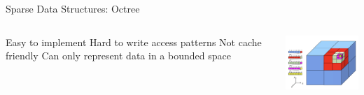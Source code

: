 \begin{frame}{Sparse Data Structures: Octree}
\begin{columns}
  \centering
  \begin{outline}
  \1 Easy to implement
  \1 Hard to write access patterns
  \1 Not cache friendly
  \1 Can only represent data in a bounded space
  \end{outline}

  \centering
  \begin{center}
  \includegraphics[width=5cm]{octree.png}
  \end{center}
\end{columns}
\end{frame}
